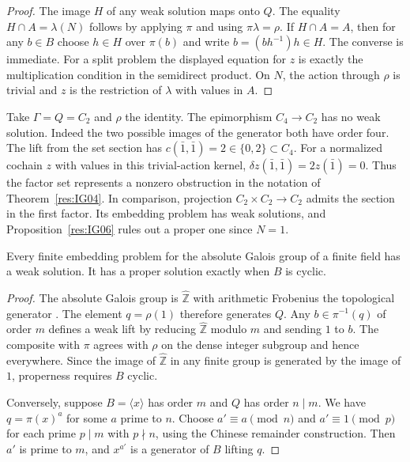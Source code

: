 \begin{proof}
The image \(H\) of any weak solution maps onto \(Q\).
The equality \(H\cap A=\lambda(N)\) follows by applying \(\pi\)
and using \(\pi\lambda=\rho\). If \(H\cap A=A\), then for
any \(b\in B\) choose \(h\in H\) over \(\pi(b)\) and write
\(b=(bh^{-1})h\in H\). The converse is immediate.
For a split problem the displayed equation for \(z\) is exactly
the multiplication condition in the semidirect product. On \(N\),
the action through \(\rho\) is trivial and \(z\) is the
restriction of \(\lambda\) with values in \(A\).
\end{proof}

\begin{example}
\label{res:IG07}
Take \(\Gamma=Q=C_2\) and \(\rho\) the identity. The epimorphism
\(C_4\to C_2\) has no weak solution. Indeed the two possible
images of the generator both have order four. The lift from the
set section has \(c(\bar 1,\bar 1)=2\in\{0,2\}\subset C_4\).
For a normalized cochain \(z\) with values in this trivial-action
kernel, \(\delta z(\bar 1,\bar 1)=2z(\bar 1)=0\). Thus the
factor set represents a nonzero obstruction in the notation of
Theorem~\ref{res:IG04}. In comparison, projection
\(C_2\times C_2\to C_2\) admits the section in the first
factor. Its embedding problem has weak solutions, and
Proposition~\ref{res:IG06} rules out a proper one since \(N=1\).
\end{example}

\begin{proposition}
\label{res:IG08}
Every finite embedding problem for the absolute Galois group of
a finite field has a weak solution. It has a proper solution
exactly when \(B\) is cyclic.
\end{proposition}

\begin{proof}
The absolute Galois group is \(\widehat{\mathbb Z}\) with
arithmetic Frobenius the topological generator
\cite[Results E04, E06 and E07]{mg-aft}. The element
\(q=\rho(1)\) therefore generates \(Q\). Any \(b\in\pi^{-1}(q)\)
of order \(m\) defines a weak lift by reducing
\(\widehat{\mathbb Z}\) modulo \(m\) and sending \(1\) to \(b\).
The composite with \(\pi\) agrees with \(\rho\) on the dense
integer subgroup and hence everywhere. Since the image of
\(\widehat{\mathbb Z}\) in any finite group is generated by
the image of \(1\), properness requires \(B\) cyclic.

Conversely, suppose \(B=\langle x\rangle\) has order \(m\) and
\(Q\) has order \(n\mid m\). We have
\(q=\pi(x)^a\) for some \(a\) prime to \(n\).
Choose \(a'\equiv a\pmod n\) and \(a'\equiv1\pmod p\) for
each prime \(p\mid m\) with \(p\nmid n\), using the Chinese
remainder construction. Then \(a'\) is prime to \(m\), and
\(x^{a'}\) is a generator of \(B\) lifting \(q\).
\end{proof}

